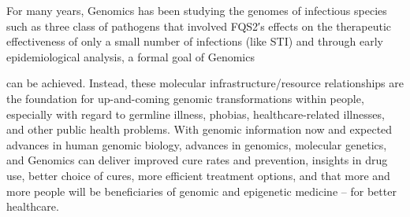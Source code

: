 \documentclass{article}
\begin{document}
For many years, Genomics has been studying the genomes of infectious species such as three class of pathogens that involved FQS2′s effects on the therapeutic effectiveness of only a small number of infections (like STI) and through early epidemiological analysis, a formal goal of Genomics

can be achieved. Instead, these molecular infrastructure/resource relationships are the foundation for up-and-coming genomic transformations within people, especially with regard to germline illness, phobias, healthcare-related illnesses, and other public health problems. With genomic information now and expected advances in human genomic biology, advances in genomics, molecular genetics, and Genomics can deliver improved cure rates and prevention, insights in drug use, better choice of cures, more efficient treatment options, and that more and more people will be beneficiaries of genomic and epigenetic medicine – for better healthcare.
\end{document}
